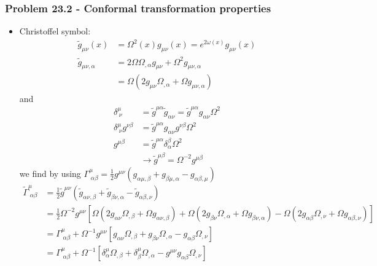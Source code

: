 \documentclass[10pt,a4paper]{book}
\theoremstyle{definition}
\begin{document}
\subsubsection{Problem 23.2 - Conformal transformation properties}
\begin{itemize}
\item Christoffel symbol:
\begin{align}
    \tilde{g}_{\mu\nu}(x)&=\Omega^2(x)g_{\mu\nu}(x)=e^{2\omega(x)}g_{\mu\nu}(x)\\
    \tilde{g}_{\mu\nu,\alpha}
    &=2\Omega\Omega_{,\alpha}g_{\mu\nu}+\Omega^2g_{\mu\nu,\alpha}\\
    &=\Omega(2g_{\mu\nu}\Omega_{,\alpha}+\Omega g_{\mu\nu,\alpha})
\end{align}
and
\begin{align}
\delta^\mu_{\;\nu}&=\tilde{g}^{\mu\alpha}\tilde{g}_{\alpha\nu}=\tilde{g}^{\mu\alpha}g_{\alpha\nu}\Omega^2\\
\delta^\mu_{\;\nu}g^{\nu\beta}&=\tilde{g}^{\mu\alpha}g_{\alpha\nu}g^{\nu\beta}\Omega^2\\
g^{\mu\beta}&=\tilde{g}^{\mu\alpha}\delta^\beta_\alpha\Omega^2\\
&\rightarrow\tilde{g}^{\mu\beta}=\Omega^{-2}g^{\mu\beta}
\end{align}
we find by using $\Gamma^\mu_{\;\alpha\beta}=\frac{1}{2}g^{\mu\nu}\left(g_{\alpha\mu,\beta}+g_{\beta\mu,\alpha}-g_{\alpha\beta,\mu}\right)$
\begin{align}
\tilde\Gamma^\mu_{\;\alpha\beta}
&=\frac{1}{2}\tilde{g}^{\mu\nu}\left(\tilde{g}_{\alpha\nu,\beta}+\tilde{g}_{\beta\nu,\alpha}-\tilde{g}_{\alpha\beta,\nu}\right)\\
&=\frac{1}{2}\Omega^{-2}g^{\mu\nu}\left[
 \Omega(2g_{\alpha\nu}\Omega_{,\beta}+\Omega g_{\alpha\nu,\beta})
+\Omega(2g_{\beta\nu}\Omega_{,\alpha}+\Omega g_{\beta\nu,\alpha})
-\Omega(2g_{\alpha\beta}\Omega_{,\nu}+\Omega g_{\alpha\beta,\nu})
\right]\\
&=\Gamma^\mu_{\;\alpha\beta}+\Omega^{-1}g^{\mu\nu}\left[
 g_{\alpha\nu}\Omega_{,\beta}
+g_{\beta\nu}\Omega_{,\alpha}
-g_{\alpha\beta}\Omega_{,\nu}
\right]\\
&=\Gamma^\mu_{\;\alpha\beta}+\Omega^{-1}\left[
 \delta^\mu_\alpha\Omega_{,\beta}
+\delta_\beta^\mu\Omega_{,\alpha}
-g^{\mu\nu}g_{\alpha\beta}\Omega_{,\nu}
\right]
\end{align}


\end{itemize}
\end{document}
